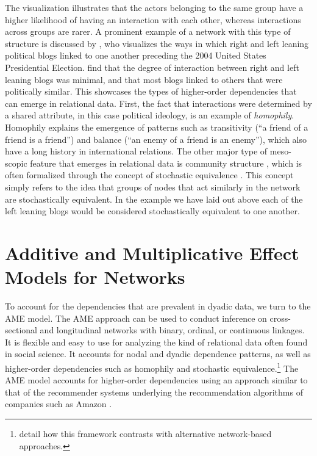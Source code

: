 The visualization illustrates that the actors belonging to the same group have a higher likelihood of having an interaction with each other, whereas interactions across groups are rarer. A prominent example of a network with this type of structure is discussed by \citet{adamic:glance:2005}, who visualizes the ways in which right and left leaning political blogs linked to one another preceding the 2004 United States Presidential Election. \citeauthor{adamic:glance:2005} find that the degree of interaction between right and left leaning blogs was minimal, and that most blogs linked to others that were politically similar. This showcases the types of higher-order dependencies that can emerge in relational data. First, the fact that interactions were determined by a shared attribute, in this case political ideology, is an example of \textit{homophily}. Homophily explains the emergence of patterns such as transitivity (``a friend of a friend is a friend'') and balance (``an enemy of a friend is an enemy''), which also have a long history in international relations. The other major type of meso-scopic feature that emerges in relational data is community structure \citep{mucha:etal:2010}, which is often formalized through the concept of stochastic equivalence \citep{anderson:etal:1992}. This concept simply refers to the idea that groups of nodes that act similarly in the network are stochastically equivalent. In the example we have laid out above each of the left leaning blogs would be considered stochastically equivalent to one another. 

\section{\textbf{Additive and Multiplicative Effect Models for Networks}}

To account for the dependencies that are prevalent in dyadic data, we turn to the AME model. The AME approach can be used to conduct inference on cross-sectional and longitudinal networks with binary, ordinal, or continuous linkages. It is flexible and easy to use for analyzing the kind of relational data often found in social science. It accounts for nodal and dyadic dependence patterns, as well as higher-order dependencies such as homophily and stochastic equivalence.\footnote{\citet{minhas:etal:2016:arxiv} detail how this framework contrasts with alternative network-based approaches.} The AME model accounts for higher-order dependencies using an approach similar to that of the recommender systems underlying the recommendation algorithms of companies such as Amazon \citep{resnick:varian:1997}. 

